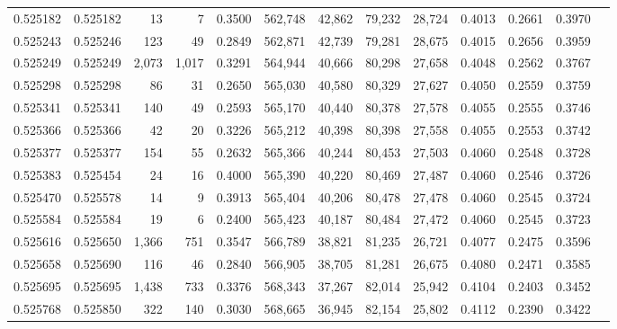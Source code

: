 \begin{tabular}{rrrrrrrrrrrrr}
0.525182 & 0.525182 &    13 &     7 &                                     0.3500 & 562,748 &  42,862 &  79,232 &  28,724 & 0.4013 & 0.2661 & 0.3970 \\
0.525243 & 0.525246 &   123 &    49 &                                     0.2849 & 562,871 &  42,739 &  79,281 &  28,675 & 0.4015 & 0.2656 & 0.3959 \\
0.525249 & 0.525249 & 2,073 & 1,017 &                                     0.3291 & 564,944 &  40,666 &  80,298 &  27,658 & 0.4048 & 0.2562 & 0.3767 \\
0.525298 & 0.525298 &    86 &    31 &                                     0.2650 & 565,030 &  40,580 &  80,329 &  27,627 & 0.4050 & 0.2559 & 0.3759 \\
0.525341 & 0.525341 &   140 &    49 &                                     0.2593 & 565,170 &  40,440 &  80,378 &  27,578 & 0.4055 & 0.2555 & 0.3746 \\
0.525366 & 0.525366 &    42 &    20 &                                     0.3226 & 565,212 &  40,398 &  80,398 &  27,558 & 0.4055 & 0.2553 & 0.3742 \\
0.525377 & 0.525377 &   154 &    55 &                                     0.2632 & 565,366 &  40,244 &  80,453 &  27,503 & 0.4060 & 0.2548 & 0.3728 \\
0.525383 & 0.525454 &    24 &    16 &                                     0.4000 & 565,390 &  40,220 &  80,469 &  27,487 & 0.4060 & 0.2546 & 0.3726 \\
0.525470 & 0.525578 &    14 &     9 &                                     0.3913 & 565,404 &  40,206 &  80,478 &  27,478 & 0.4060 & 0.2545 & 0.3724 \\
0.525584 & 0.525584 &    19 &     6 &                                     0.2400 & 565,423 &  40,187 &  80,484 &  27,472 & 0.4060 & 0.2545 & 0.3723 \\
0.525616 & 0.525650 & 1,366 &   751 &                                     0.3547 & 566,789 &  38,821 &  81,235 &  26,721 & 0.4077 & 0.2475 & 0.3596 \\
0.525658 & 0.525690 &   116 &    46 &                                     0.2840 & 566,905 &  38,705 &  81,281 &  26,675 & 0.4080 & 0.2471 & 0.3585 \\
0.525695 & 0.525695 & 1,438 &   733 &                                     0.3376 & 568,343 &  37,267 &  82,014 &  25,942 & 0.4104 & 0.2403 & 0.3452 \\
0.525768 & 0.525850 &   322 &   140 &                                     0.3030 & 568,665 &  36,945 &  82,154 &  25,802 & 0.4112 & 0.2390 & 0.3422 \\

\end{tabular}
